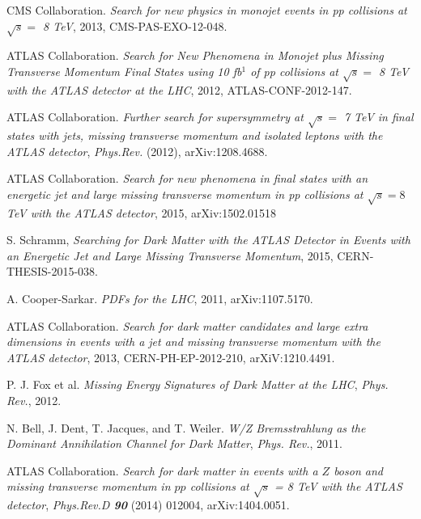CMS Collaboration. \emph{Search for new physics in monojet events in pp collisions at $\sqrt{s} =$ 8 TeV}, 2013, CMS-PAS-EXO-12-048.

ATLAS Collaboration. \emph{Search for New Phenomena in Monojet plus Missing Transverse Momentum Final States using 10 fb$^{1}$ of pp collisions at $\sqrt{s} =$ 8 TeV with the ATLAS detector at the LHC}, 2012, ATLAS-CONF-2012-147.

ATLAS Collaboration. \emph{Further search for supersymmetry at $\sqrt{s} =$ 7 TeV in final states with jets, missing transverse momentum and isolated leptons with the ATLAS detector}, \emph{Phys.Rev.} (2012), arXiv:1208.4688.

ATLAS Collaboration. \emph{Search for new phenomena in final states with an energetic jet and large missing transverse momentum in pp collisions at $\sqrt{s}=8$ TeV with the ATLAS detector}, 2015, arXiv:1502.01518

S. Schramm, \emph{Searching for Dark Matter with the ATLAS Detector in Events with an Energetic Jet and Large Missing Transverse Momentum}, 2015, CERN-THESIS-2015-038.

A. Cooper-Sarkar. \emph{PDFs for the LHC}, 2011, arXiv:1107.5170.

ATLAS Collaboration. \emph{Search for dark matter candidates and large extra dimensions in events with a jet and missing transverse momentum with the ATLAS detector}, 2013, CERN-PH-EP-2012-210, arXiV:1210.4491.

P. J. Fox et al. \emph{Missing Energy Signatures of Dark Matter at the LHC}, \emph{Phys. Rev.}, 2012.

N. Bell, J. Dent, T. Jacques, and T. Weiler. \emph{W/Z Bremsstrahlung as the Dominant Annihilation Channel for Dark Matter}, \emph{Phys. Rev.}, 2011.

ATLAS Collaboration. \emph{Search for dark matter in events with a $Z$ boson and missing transverse momentum in $pp$ collisions at $\sqrt{s}$ = 8 TeV with the ATLAS detector}, \emph{Phys.Rev.D \textbf{90}} (2014) 012004, arXiv:1404.0051.



